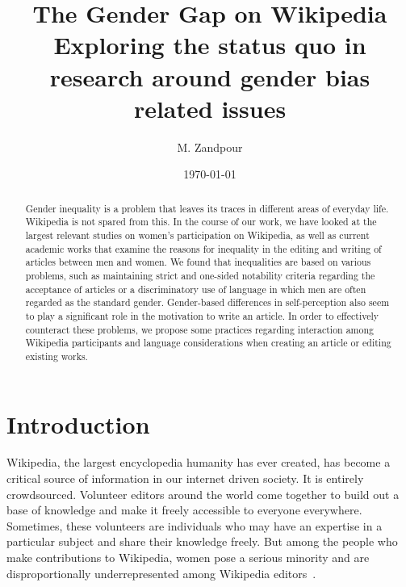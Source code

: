 \documentclass[a4paper, 11pt]{article}
\title{%
	The Gender Gap on Wikipedia \\
	\large{
		Exploring the status quo in research around gender bias related issues
	}
}
\begin{document}
\date{\today}
\author{M. Zandpour}
\maketitle

\begin{abstract}
Gender inequality is a problem that leaves its traces in different areas of everyday life. Wikipedia is not spared from this. In the course of our work, we have looked at the largest relevant studies on women's participation on Wikipedia, as well as current academic works that examine the reasons for inequality in the editing and writing of articles between men and women. We found that inequalities are based on various problems, such as maintaining strict and one-sided notability criteria regarding the acceptance of articles or a discriminatory use of language in which men are often regarded as the standard gender. Gender-based differences in self-perception also seem to play a significant role in the motivation to write an article. In order to effectively counteract these problems, we propose some practices regarding interaction among Wikipedia participants and language considerations when creating an article or editing existing works.
\end{abstract}

\section{Introduction} \label{sec:intro}

Wikipedia, the largest encyclopedia humanity has ever created, has become a critical source of information in our internet driven society. It is entirely crowdsourced. Volunteer editors around the world come together to build out a base of knowledge and make it freely accessible to everyone everywhere. Sometimes, these volunteers are individuals who may have an expertise in a particular subject and share their knowledge freely. But among the people who make contributions to Wikipedia, women pose a serious minority and are disproportionally underrepresented among Wikipedia editors~\cite{shammaa2014}.
\end{document}
